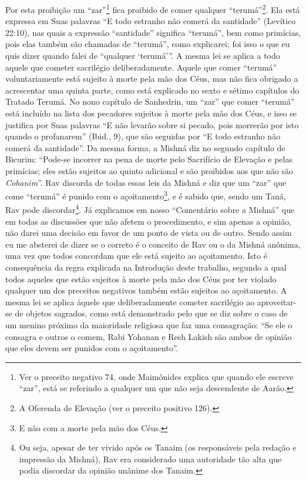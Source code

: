 Por esta proibição um ``zar''\footnote{Ver o preceito negativo 74, onde Maimônides explica que quando ele
  escreve ``zar'', está se referindo a qualquer um que não seja
  descendente de Aarão.} fica proibido de
comer qualquer ``terumá''\footnote{A Oferenda de Elevação (ver o preceito positivo 126).}. Ela está expressa em
Suas palavras ``E todo estranho não comerá
da santidade'' (Levítico 22:10), nas quais a expressão ``santidade''
significa ``terumá'', bem como primícias, pois elas também são chamadas
de ``terumá'', como explicarei; foi isso o que eu quis dizer quando
falei de ``qualquer `terumá'''.
A mesma lei se aplica a todo aquele que cometer sacrilégio
deliberadamente.
Aquele que comer ``terumá'' voluntariamente está sujeito à morte
pela mão dos Céus, mas não fica obrigado a acrescentar uma quinta parte,
como está explicado no sexto e sétimo capítulos do Tratado Terumá. No
nono capítulo de Sanhedrin, um ``zar'' que comer ``terumá'' está incluído na
lista dos
pecadores sujeitos à morte pela mão dos Céus, e isso se justifica por
Suas palavras ``E não levarão sobre si pecado, pois morrerão por isto
quando o profanarem'' (Ibid., 9), que são seguidas por ``E todo estranho
não comerá da santidade''. Da mesma forma, a Mishná diz no segundo
capítulo de Bicurim: ``Pode-se incorrer na pena de morte pelo Sacrifício de Elevação e pelas primícias; eles
estão sujeitos ao quinto adicional e são proibidos aos que não são
\textit{Cohanim}''.
Rav discorda de todas essas leis da Mishná e diz que um ``zar'' que
come ``terumá'' é punido com o açoitamento\footnote{E não com a morte pela mão dos Céus.}, e é
sabido que, sendo um Taná, Rav pode discordar\footnote{Ou seja, apesar de ter vivido após os Tanaim (os responsáveis pela
  redação e impressão da Mishná), Rav era considerado uma autoridade tão
  alta que podia discordar da opinião unânime dos Tanaim.}. Já
explicamos em nosso ``Comentário sobre a Mishná'' que em todas as
discussões que não afetem o procedimento, e sim apenas a opinião, não darei uma decisão em favor de um ponto de vista ou de
outro. Sendo assim eu me absterei de dizer se o correto é o conceito de
Rav ou o da Mishná anônima, uma vez que todos concordam que ele está
sujeito ao açoitamento. Isto é consequência da regra explicada na
Introdução deste trabalho, segundo a qual todos aqueles que estão
sujeitos à morte pela mão dos Céus por ter violado qualquer um dos
preceitos negativos também estão sujeitos ao açoitamento. A mesma lei se
aplica àquele que deliberadamente cometer sacrilégio ao aproveitar-se
de objetos sagrados, como está demonstrado pelo que se diz sobre o caso
de um menino próximo da maioridade religiosa que faz uma consagração:
``Se ele o consagra e outros o comem, Rabi Yohanan e Resh Lakish são
ambos de opinião que eles devem ser punidos com o açoitamento''.

